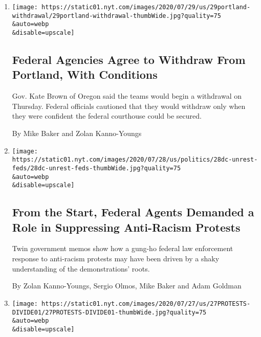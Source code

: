\begin{enumerate}
\def\labelenumi{\arabic{enumi}.}
\item
  \href{/2020/07/29/us/protests-portland-federal-withdrawal.html}{}

  \texttt{[image: https://static01.nyt.com/images/2020/07/29/us/29portland-withdrawal/29portland-withdrawal-thumbWide.jpg?quality=75\\\&auto=webp\\\&disable=upscale]}

  \hypertarget{federal-agencies-agree-to-withdraw-from-portland-with-conditions}{%
  \subsection{Federal Agencies Agree to Withdraw From Portland, With
  Conditions}\label{federal-agencies-agree-to-withdraw-from-portland-with-conditions}}

  Gov. Kate Brown of Oregon said the teams would begin a withdrawal on
  Thursday. Federal officials cautioned that they would withdraw only
  when they were confident the federal courthouse could be secured.

  By Mike Baker and Zolan Kanno-Youngs
\item
  \href{/2020/07/28/us/federal-agents-portland-seattle-protests.html}{}

  \texttt{[image: https://static01.nyt.com/images/2020/07/28/us/politics/28dc-unrest-feds/28dc-unrest-feds-thumbWide.jpg?quality=75\\\&auto=webp\\\&disable=upscale]}

  \hypertarget{from-the-start-federal-agents-demanded-a-role-in-suppressing-anti-racism-protests}{%
  \subsection{From the Start, Federal Agents Demanded a Role in
  Suppressing Anti-Racism
  Protests}\label{from-the-start-federal-agents-demanded-a-role-in-suppressing-anti-racism-protests}}

  Twin government memos show how a gung-ho federal law enforcement
  response to anti-racism protests may have been driven by a shaky
  understanding of the demonstrations' roots.

  By Zolan Kanno-Youngs, Sergio Olmos, Mike Baker and Adam Goldman
\item
  \href{/2020/07/27/us/protests-divisions-blm.html}{}

  \texttt{[image: https://static01.nyt.com/images/2020/07/27/us/27PROTESTS-DIVIDE01/27PROTESTS-DIVIDE01-thumbWide.jpg?quality=75\\\&auto=webp\\\&disable=upscale]}


\end{enumerate}
